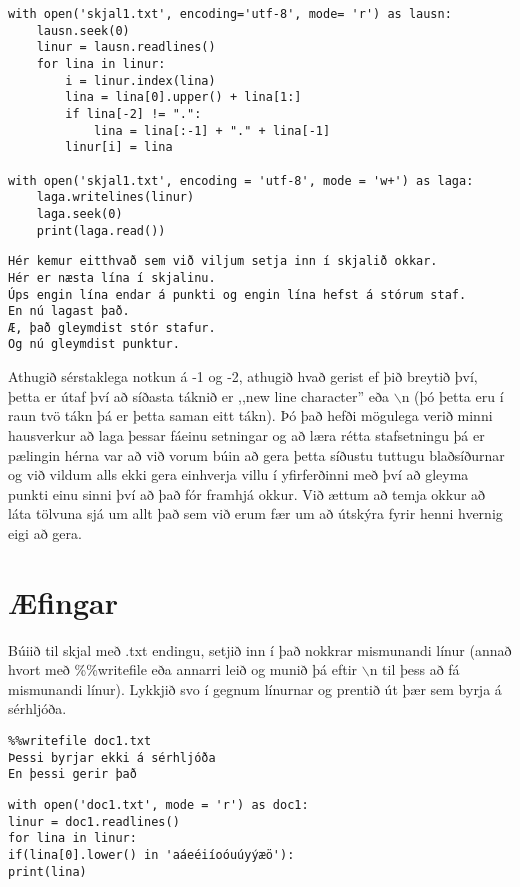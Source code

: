 \begin{lstlisting}[caption=Leysum punkta og hástafa vandann okkar, label=lst:skjalavinnsla-lausn]
with open('skjal1.txt', encoding='utf-8', mode= 'r') as lausn:
	lausn.seek(0)
	linur = lausn.readlines()
	for lina in linur:
		i = linur.index(lina)
		lina = lina[0].upper() + lina[1:]
		if lina[-2] != ".":
			lina = lina[:-1] + "." + lina[-1]
		linur[i] = lina

with open('skjal1.txt', encoding = 'utf-8', mode = 'w+') as laga:
	laga.writelines(linur)
	laga.seek(0)
	print(laga.read())
\end{lstlisting}
\lstset{style=uttak}
\begin{lstlisting}
Hér kemur eitthvað sem við viljum setja inn í skjalið okkar.
Hér er næsta lína í skjalinu.
Úps engin lína endar á punkti og engin lína hefst á stórum staf.
En nú lagast það.
Æ, það gleymdist stór stafur.
Og nú gleymdist punktur.
\end{lstlisting}
\lstset{style=venjulegt}

Athugið sérstaklega notkun á -1 og -2, athugið hvað gerist ef þið breytið því, þetta er útaf því að síðasta táknið er ,,new line character'' eða $\backslash$n (þó þetta eru í raun tvö tákn þá er þetta saman eitt tákn).
Þó það hefði mögulega verið minni hausverkur að laga þessar fáeinu setningar og að læra rétta stafsetningu þá er pælingin hérna var að við vorum búin að gera þetta síðustu tuttugu blaðsíðurnar og við vildum alls ekki gera einhverja villu í yfirferðinni með því að gleyma punkti einu sinni því að það fór framhjá okkur.
Við ættum að temja okkur að láta tölvuna sjá um allt það sem við erum fær um að útskýra fyrir henni hvernig eigi að gera.

\newpage
\section{Æfingar}

\begin{exercise}\label{doc1}
Búiið til skjal með .txt endingu, setjið inn í það nokkrar mismunandi línur (annað hvort með \%\%writefile eða annarri leið og munið þá eftir $\backslash$n til þess að fá mismunandi línur).
Lykkjið svo í gegnum línurnar og prentið út þær sem byrja á sérhljóða.
\end{exercise}
\begin{Answer}[ref={doc1}]

	\begin{lstlisting}
%%writefile doc1.txt
Þessi byrjar ekki á sérhljóða
En þessi gerir það
\end{lstlisting}
\begin{lstlisting}
with open('doc1.txt', mode = 'r') as doc1:
linur = doc1.readlines()
for lina in linur:
if(lina[0].lower() in 'aáeéiíoóuúyýæö'):
print(lina)\end{lstlisting}
\end{Answer}


